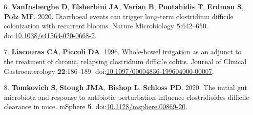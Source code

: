 \documentclass[
  11pt,
]{article}
\begin{document}
\leavevmode\hypertarget{ref-VanInsberghe2020}{}%
6. \textbf{VanInsberghe D}, \textbf{Elsherbini JA}, \textbf{Varian B},
\textbf{Poutahidis T}, \textbf{Erdman S}, \textbf{Polz MF}. 2020.
Diarrhoeal events can trigger long-term clostridium difficile
colonization with recurrent blooms. Nature Microbiology
\textbf{5}:642--650.
doi:\href{https://doi.org/10.1038/s41564-020-0668-2}{10.1038/s41564-020-0668-2}.

\leavevmode\hypertarget{ref-Liacouras1996}{}%
7. \textbf{Liacouras CA}, \textbf{Piccoli DA}. 1996. Whole-bowel
irrigation as an adjunct to the treatment of chronic, relapsing
clostridium difficile colitis. Journal of Clinical Gastroenterology
\textbf{22}:186--189.
doi:\href{https://doi.org/10.1097/00004836-199604000-00007}{10.1097/00004836-199604000-00007}.

\leavevmode\hypertarget{ref-Tomkovich2020}{}%
8. \textbf{Tomkovich S}, \textbf{Stough JMA}, \textbf{Bishop L},
\textbf{Schloss PD}. 2020. The initial gut microbiota and response to
antibiotic perturbation influence clostridioides difficile clearance in
mice. mSphere \textbf{5}.
doi:\href{https://doi.org/10.1128/msphere.00869-20}{10.1128/msphere.00869-20}.
\end{document}
